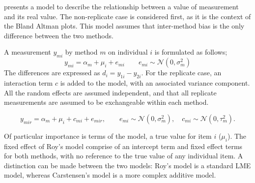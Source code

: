 \documentclass{report}
\begin{document}
	
	
	\citet{BXC2004} presents a model to describe the relationship between a value of measurement and its
	real value. The non-replicate case is considered first, as it is the context of the Bland Altman plots. This model assumes that inter-method bias is the only difference between the two methods.
	
	A measurement $y_{mi}$ by method $m$ on individual $i$ is formulated as follows;
	\begin{equation}
	y_{mi}  = \alpha_{m} + \mu_{i} + e_{mi} \qquad  e_{mi} \sim
	\mathcal{N}(0,\sigma^{2}_{m})
	\end{equation}
	The differences are expressed as $d_{i} = y_{1i} - y_{2i}$. For the replicate case, an interaction term $c$ is added to the model, with an associated variance component. All the random effects are assumed independent, and that all replicate measurements are assumed to be exchangeable within each method.
	
	\begin{equation}
	y_{mir}  = \alpha_{m} + \mu_{i} + c_{mi} + e_{mir}, \qquad  e_{mi}
	\sim \mathcal{N}(0,\sigma^{2}_{m}), \quad c_{mi} \sim \mathcal{N}(0,\tau^{2}_{m}).
	\end{equation}
	
	Of particular importance is terms of the model, a true value for item $i$ ($\mu_{i}$).  The fixed effect of Roy's model comprise of an intercept term and fixed effect terms for both methods, with no reference to the true value of any individual item. A distinction can be made between the two models: Roy's model is a standard LME model, whereas Carstensen's model is a more complex additive model.
	
	
	
\end{document}
